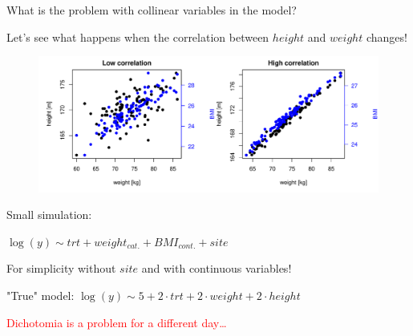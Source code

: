 \documentclass[english]{beamer}\usepackage[]{graphicx}\usepackage[]{xcolor}
\makeatletter
\def\maxwidth{ %
  \ifdim\Gin@nat@width>\linewidth
    \linewidth
  \else
    \Gin@nat@width
  \fi
}
\newenvironment{knitrout}{}{} %
\makeatother
\begin{document}
\begin{frame}{What is the problem with collinear variables in the model?}

Let's see what happens when the correlation between $height$ and $weight$ changes!

\begin{figure}[h]%
\begin{center}
\begin{knitrout}
\color{fgcolor}
\includegraphics[width=\maxwidth]{figures/figcollinearitydata-1} 
\end{knitrout}
\end{center}
\end{figure}

\end{frame}
\begin{frame}{Small simulation:}

\begin{center}
$\boxed{\log(y)\sim trt + weight_{cat.} + BMI_{cont.}+ site}$

For simplicity without $site$ and with continuous variables!

"True" model: $\log(y)\sim 5 +  2\cdot trt +  2\cdot weight +  2\cdot height$





\textcolor{red}{Dichotomia is a problem for a different day\dots}
\end{center}


% 
% 

\end{frame}
\end{document}
